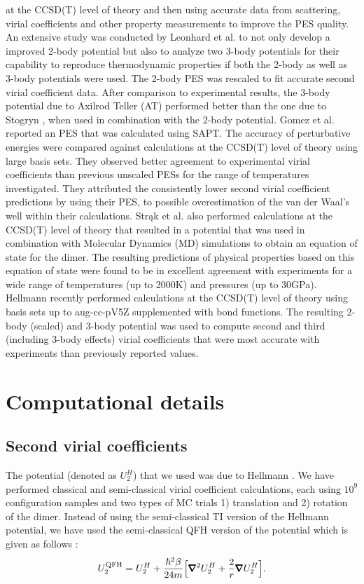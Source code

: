 at the CCSD(T) level of theory and then using accurate data from scattering, virial coefficients and other property measurements to improve the PES quality. An extensive \abinitio{} study was conducted by Leonhard et al. \cite{Leonhard2002} to not only develop a improved 2-body potential but also to analyze two 3-body potentials for their capability to reproduce thermodynamic properties if both the 2-body as well as 3-body potentials were used. The 2-body \abinitio{} PES was rescaled to fit accurate second virial coefficient data. After comparison to experimental results, the 3-body potential due to Axilrod Teller (AT) \cite{Axilrod1943} performed better than the one due to Stogryn \cite{Stogryn1969}, when used in combination with the 2-body potential. Gomez et al. \cite{Gomez2007} reported an \abinitio{} PES that was calculated using SAPT. The accuracy of perturbative energies were compared against calculations at the CCSD(T) level of theory using large basis sets. They observed better agreement to experimental virial coefficients than previous unscaled PESs for the range of temperatures investigated. They attributed the consistently lower second virial coefficient predictions by using their PES, to possible overestimation of the van der Waal's well within their calculations. Str\k{a}k et al. \cite{Strak2007} also performed \abinitio{} calculations at the CCSD(T) level of theory that resulted in a potential that was used in combination with Molecular Dynamics (MD) simulations to obtain an equation of state for the dimer. The resulting predictions of physical properties based on this equation of state were found to be in excellent agreement with experiments for a wide range of temperatures (up to 2000K) and pressures (up to 30GPa). Hellmann \cite{Hellmann2013} recently performed \abinitio{} calculations at the CCSD(T) level of theory using basis sets up to aug-cc-pV5Z supplemented with bond functions. The resulting 2-body (scaled) and 3-body potential was used to compute second and third (including 3-body effects) virial coefficients that were most accurate with experiments than previously reported values.
\section{Computational details}
    \subsection{Second virial coefficients}
    \label{subsubsec:b2n2}
        The \abinitio{} potential (denoted as $U_2^H$) that we used was due to Hellmann \cite{Hellmann2013}. We have performed classical and semi-classical virial coefficient calculations, each using $10^9$ configuration samples and two types of MC trials 1) translation and 2) rotation of the dimer. Instead of using the semi-classical TI version of the Hellmann potential, we have used the semi-classical QFH version of the potential which is given as follows \cite{Feynman,Schenter2002}:
        \begin{equation}
        \label{eq:QFH}
            U_2^{\rm QFH} = U_2^H + \displaystyle\frac{\hbar^2 \beta}{24 m} \Big[ \pmb{\nabla}^2 U_2^H + \frac{2}{r} \pmb{\nabla} U_2^H \Big].
        \end{equation}

